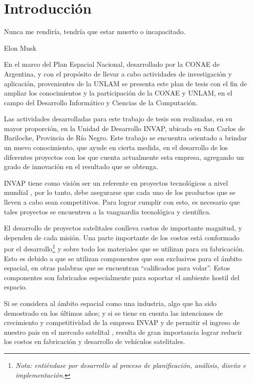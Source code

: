 \chapter{Introducción}\label{chap:intro}
\epigraph{Nunca me rendiría, tendría que estar muerto o incapacitado.}{Elon Musk} 
En el marco del Plan Espacial Nacional, desarrollado por la \ac{CONAE} de Argentina, y con el propósito de llevar a cabo actividades de investigación y 
aplicación, provenientes de la \ac{UNLAM} se presenta este plan de tesis con el fin de ampliar los 
conocimientos y la participación de la \ac{CONAE} y \ac{UNLAM}, en el campo del Desarrollo Informático y 
Ciencias de la Computación.

Las actividades desarrolladas para este trabajo de tesis son realizadas, en su mayor proporción, en 
la Unidad de Desarrollo \ac{INVAP}, ubicada en San Carlos de Bariloche, Provincia de Río Negro. Este 
trabajo se encuentra orientado a brindar un nuevo conocimiento, que ayude en cierta medida, en el 
desarrollo de los diferentes proyectos con los que cuenta actualmente esta empresa, agregando un 
grado de innovación en el resultado que se obtenga.

\ac{INVAP} tiene como visión ser un referente en proyectos tecnológicos a nivel mundial \citep{invapWEB}, 
por lo tanto, debe asegurarse que cada uno de los productos que se lleven a cabo sean competitivos. 
Para lograr cumplir con esto, es necesario que tales proyectos se encuentren a la vanguardia 
tecnológica y científica.  

El desarrollo de proyectos satelitales conlleva costos de importante magnitud, y 
dependen de cada misión. Una parte importante de los costos está conformado por el 
desarrollo\footnote{\textit{Nota: entiéndase por desarrollo al proceso de planificación, análisis, 
diseño e implementación.}} y sobre todo los materiales que se utilizan para su fabricación. Esto 
es debido a que se utilizan componentes que son exclusivos para el ámbito espacial, en otras 
palabras que se encuentran ``calificados para volar''. Estos componentes son fabricados especialmente para soportar el ambiente hostil del espacio.

Si se considera al ámbito espacial como una industria, algo que ha sido demostrado en los últimos 
años; y si se tiene en cuenta las intenciones de crecimiento y competitividad de la empresa INVAP y de permitir el ingreso de nuestro pais en el mercado satelital \cite{invapWEB}, resulta de gran 
importancia lograr reducir los costos en fabricación y desarrollo de vehículos satelitales.

